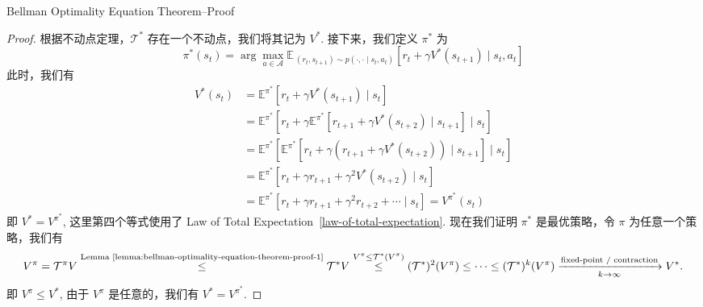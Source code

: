 \documentclass[aspectratio=169]{beamer}
\begin{document}
\begin{frame}{Bellman Optimality Equation Theorem--Proof}
    \tiny
    \begin{proof}
        根据不动点定理，$\mathcal{T}^*$ 存在一个不动点，我们将其记为 $V^*$. 接下来，我们定义 $\pi^*$ 为
        \begin{equation}
        \pi^*(s_t) = \arg\max_{a\in\mathcal{A}}\mathbb{E}_{\ (r_t,s_{t+1})\sim p(\cdot,\cdot\mid s_t,a_t)}\left[r_t+\gamma V^*(s_{t+1})\mid s_t, a_t\right]
        \end{equation}
        此时，我们有
        \begin{align}
            V^*(s_t) &= \mathbb{E}^{\pi^*}\left[r_t+\gamma V^*(s_{t+1})\mid s_t\right]\\
            &= \mathbb{E}^{\pi^*}\left[r_t+\gamma \mathbb{E}^{\pi^*}\left[r_{t+1}+\gamma V^*(s_{t+2})\mid s_{t+1}\right]\mid s_t\right]\\
            &= \mathbb{E}^{\pi^*}\left[\mathbb{E}^{\pi^*}\left[r_t+\gamma (r_{t+1}+\gamma V^*(s_{t+2}))\mid s_{t+1}\right]\mid s_t\right]\\
            &= \mathbb{E}^{\pi^*}\left[r_t+\gamma r_{t+1}+\gamma^2 V^*(s_{t+2})\mid s_t\right]\\
            &= \mathbb{E}^{\pi^*}\left[r_t+\gamma r_{t+1}+\gamma^2r_{t+2}+\cdots\mid s_t\right]= V^{\pi^*}(s_t)
        \end{align}
        即 $V^*=V^{\pi^*}$, 这里第四个等式使用了 Law of Total Expectation~\ref{law-of-total-expectation}. 现在我们证明 $\pi^*$ 是最优策略，令 $\pi$ 为任意一个策略，我们有
        \begin{equation}
        V^\pi=\mathcal{T}^{\pi}V \overset{\text{Lemma~\ref{lemma:bellman-optimality-equation-theorem-proof-1}}}{\le} \mathcal{T}^*V
        \overset{V^\pi\leq \mathcal{T}^*(V^\pi)}{\leq}(\mathcal{T}^*)^2(V^\pi)
        \leq \cdots
        \leq (\mathcal{T}^*)^k(V^\pi)
        \xrightarrow[k\to\infty]{\text{fixed-point / contraction}} V^*.
        \end{equation}
        即 $V^\pi\leq V^*$, 由于 $V^\pi$ 是任意的，我们有 $V^*=V^{\pi^*}$.
    \end{proof}
\end{frame}
\end{document}
